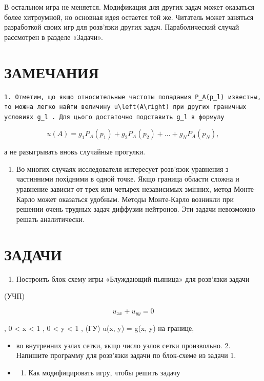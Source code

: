\documentclass[
]{article}
\providecommand{\tightlist}{%
  \setlength{\itemsep}{0pt}\setlength{\parskip}{0pt}}
\begin{document}
В остальном игра не меняется. Модификация для других задач может
оказаться более хитроумной, но основная идея остается той же. Читатель
может заняться разработкой своих игр для розв'язки других задач.
Параболический случай рассмотрен в разделе «Задачи».

\section{ЗАМЕЧАНИЯ}\label{ux437ux430ux43cux435ux447ux430ux43dux438ux44f-6}

\begin{verbatim}
1. Отметим, що якщо относительные частоты попадания P_A(p_l) известны, то можна легко найти величину u\left(A\right) при других граничных условиях g_l . Для цього достаточно подставить g_l в формулу
\end{verbatim}

\[
u(A) = g_1 P_A(p_1) + g_2 P_A(p_2) + \dots + g_N P_A(p_N),
\]

а не разыгрывать вновь случайные прогулки.

\begin{enumerate}
\def\labelenumi{\arabic{enumi}.}
\setcounter{enumi}{1}
\tightlist
\item
  Во многих случаях исследователя интересует розв'язок уравнения з
  частинними похідними в одной точке. Якщо граница области сложна и
  уравнение зависит от трех или четырех независимых змінних, метод
  Монте-Карло может оказаться удобным. Методы Монте-Карло возникли при
  решении очень трудных задач диффузии нейтронов. Эти задачи невозможно
  решать аналитически.
\end{enumerate}

\section{ЗАДАЧИ}\label{ux437ux430ux434ux430ux447ux438-7}

\begin{enumerate}
\def\labelenumi{\arabic{enumi}.}
\tightlist
\item
  Построить блок-схему игры «Блуждающий пьяница» для розв'язки задачи
\end{enumerate}

(УЧП)

\[
u_{xx} + u_{yy} = 0
\]

, 0 \textless{} x \textless{} 1 , 0 \textless{} y \textless{} 1 , (ГУ)
u(x, y) = g(x, y) на границе,

\begin{itemize}
\item
  во внутренних узлах сетки, якщо число узлов сетки произвольно. 2.
  Напишите программу для розв'язки задачи по блок-схеме из задачи 1.
\item
  \begin{enumerate}
  \def\labelenumi{\arabic{enumi}.}
  \setcounter{enumi}{2}
  \tightlist
  \item
    Как модифицировать игру, чтобы решить задачу
  \end{enumerate}
\end{itemize}
\end{document}
